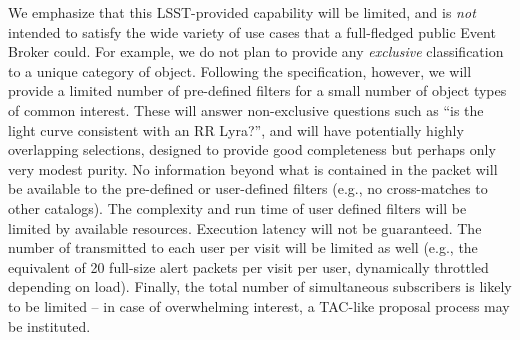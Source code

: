 \documentclass[SE,lsstdraft,toc]{lsstdoc}
\begin{document}
We emphasize that this LSST-provided capability will be limited, and is \emph{not} intended to satisfy the wide variety of use cases that a full-fledged public Event Broker could.
For example, we do not plan to provide any \emph{exclusive} classification to a unique category of object.
Following the \SRD specification, however, we will provide a limited number of pre-defined filters for a small number of object types of common interest.
These will answer non-exclusive questions such as ``is the light curve consistent with an RR Lyra?'', and will have potentially highly overlapping selections, designed to provide good completeness but perhaps only very modest purity.
No information beyond what is contained in the \VOEvent packet will be available to the pre-defined or user-defined filters (e.g., no cross-matches to other catalogs).
The complexity and run time of user defined filters will be limited by available resources.
Execution latency will not be guaranteed.
The number of \VOEvents transmitted to each user per visit will be limited as well (e.g., the equivalent of 20 full-size alert packets per visit per user, dynamically throttled depending on load).
Finally, the total number of simultaneous subscribers is likely to be limited -- in case of overwhelming interest, a TAC-like proposal process may be instituted.
\end{document}
